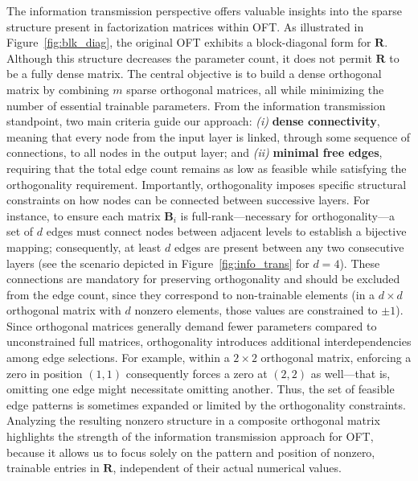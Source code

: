 The information transmission perspective offers valuable insights into the sparse structure present in factorization matrices within OFT. As illustrated in Figure~\ref{fig:blk_diag}, the original OFT exhibits a block-diagonal form for $\bm{R}$. Although this structure decreases the parameter count, it does not permit $\bm{R}$ to be a fully dense matrix. The central objective is to build a dense orthogonal matrix by combining $m$ sparse orthogonal matrices, all while minimizing the number of essential trainable parameters. From the information transmission standpoint, two main criteria guide our approach: \emph{(i)} \textbf{dense connectivity}, meaning that every node from the input layer is linked, through some sequence of connections, to all nodes in the output layer; and \emph{(ii)} \textbf{minimal free edges}, requiring that the total edge count remains as low as feasible while satisfying the orthogonality requirement. Importantly, orthogonality imposes specific structural constraints on how nodes can be connected between successive layers. For instance, to ensure each matrix $\bm{B}_i$ is full-rank—necessary for orthogonality—a set of $d$ edges must connect nodes between adjacent levels to establish a bijective mapping; consequently, at least $d$ edges are present between any two consecutive layers (see the scenario depicted in Figure~\ref{fig:info_trans} for $d=4$). These connections are mandatory for preserving orthogonality and should be excluded from the edge count, since they correspond to non-trainable elements (in a $d\times d$ orthogonal matrix with $d$ nonzero elements, those values are constrained to $\pm1$). Since orthogonal matrices generally demand fewer parameters compared to unconstrained full matrices, orthogonality introduces additional interdependencies among edge selections. For example, within a $2\times2$ orthogonal matrix, enforcing a zero in position $(1,1)$ consequently forces a zero at $(2,2)$ as well—that is, omitting one edge might necessitate omitting another. Thus, the set of feasible edge patterns is sometimes expanded or limited by the orthogonality constraints. Analyzing the resulting nonzero structure in a composite orthogonal matrix highlights the strength of the information transmission approach for OFT, because it allows us to focus solely on the pattern and position of nonzero, trainable entries in $\bm{R}$, independent of their actual numerical values.

